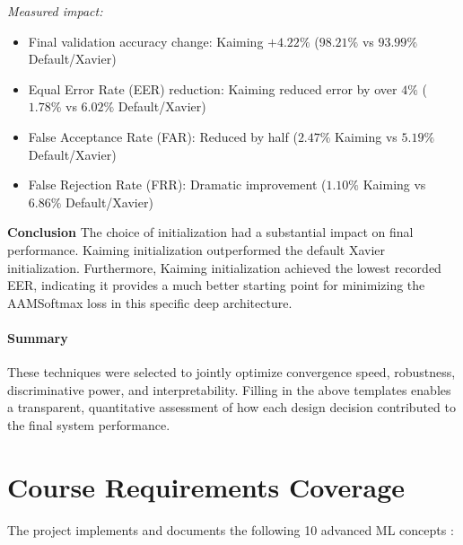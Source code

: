 \documentclass[12pt,a4paper]{article}
\begin{document}
\textit{Measured impact:}
\begin{itemize}
    \item Final validation accuracy change: Kaiming $+4.22\%$ ($98.21\%$ vs $93.99\%$ Default/Xavier)
    \item Equal Error Rate (EER) reduction: Kaiming reduced error by over $4\%$ ($1.78\%$ vs $6.02\%$ Default/Xavier)
    \item False Acceptance Rate (FAR): Reduced by half ($2.47\%$ Kaiming vs $5.19\%$ Default/Xavier)
    \item False Rejection Rate (FRR): Dramatic improvement ($1.10\%$ Kaiming vs $6.86\%$ Default/Xavier)
\end{itemize}
\textbf{Conclusion}
The choice of initialization had a substantial impact on final performance. Kaiming initialization outperformed the default Xavier initialization.
Furthermore, Kaiming initialization achieved the lowest recorded EER,
 indicating it provides a much better starting point for minimizing the AAMSoftmax loss in this specific deep architecture.

\paragraph{Summary}
These techniques were selected to jointly optimize convergence speed, robustness, discriminative power, and interpretability. Filling in the above templates enables a transparent, quantitative assessment of how each design decision contributed to the final system performance.






\section{Course Requirements Coverage}

The project implements and documents the following 10 advanced ML concepts :
\end{document}
